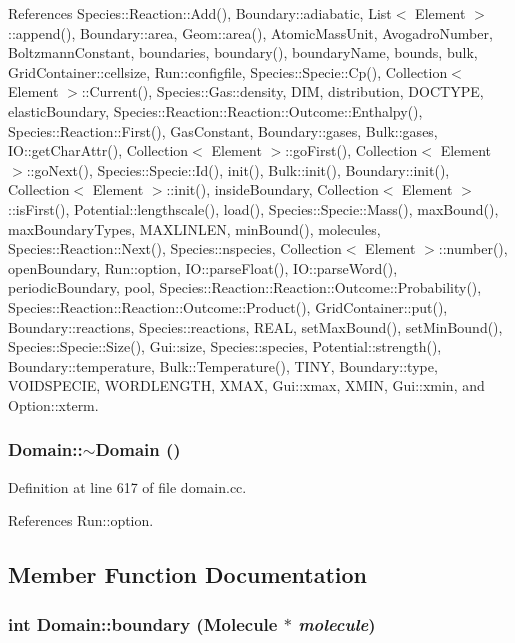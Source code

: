 References Species::Reaction::Add(), Boundary::adiabatic, List$<$ Element $>$::append(), Boundary::area, Geom::area(), AtomicMassUnit, AvogadroNumber, BoltzmannConstant, boundaries, boundary(), boundaryName, bounds, bulk, GridContainer::cellsize, Run::configfile, Species::Specie::Cp(), Collection$<$ Element $>$::Current(), Species::Gas::density, DIM, distribution, DOCTYPE, elasticBoundary, Species::Reaction::Reaction::Outcome::Enthalpy(), Species::Reaction::First(), GasConstant, Boundary::gases, Bulk::gases, IO::getCharAttr(), Collection$<$ Element $>$::goFirst(), Collection$<$ Element $>$::goNext(), Species::Specie::Id(), init(), Bulk::init(), Boundary::init(), Collection$<$ Element $>$::init(), insideBoundary, Collection$<$ Element $>$::isFirst(), Potential::lengthscale(), load(), Species::Specie::Mass(), maxBound(), maxBoundaryTypes, MAXLINLEN, minBound(), molecules, Species::Reaction::Next(), Species::nspecies, Collection$<$ Element $>$::number(), openBoundary, Run::option, IO::parseFloat(), IO::parseWord(), periodicBoundary, pool, Species::Reaction::Reaction::Outcome::Probability(), Species::Reaction::Reaction::Outcome::Product(), GridContainer::put(), Boundary::reactions, Species::reactions, REAL, setMaxBound(), setMinBound(), Species::Specie::Size(), Gui::size, Species::species, Potential::strength(), Boundary::temperature, Bulk::Temperature(), TINY, Boundary::type, VOIDSPECIE, WORDLENGTH, XMAX, Gui::xmax, XMIN, Gui::xmin, and Option::xterm.\hypertarget{classDomain_29cec9afb2e54c810ba1f3c1a49543a8}{
\subsubsection[{$\sim$Domain}]{\setlength{\rightskip}{0pt plus 5cm}Domain::$\sim$Domain ()}}
\label{classDomain_29cec9afb2e54c810ba1f3c1a49543a8}




Definition at line 617 of file domain.cc.

References Run::option.

\subsection{Member Function Documentation}
\hypertarget{classDomain_95f1918505199482138ce894f1f4e3ac}{
\subsubsection[{boundary}]{\setlength{\rightskip}{0pt plus 5cm}int Domain::boundary ({\bf Molecule} $\ast$ {\em molecule})}}
\label{classDomain_95f1918505199482138ce894f1f4e3ac}




